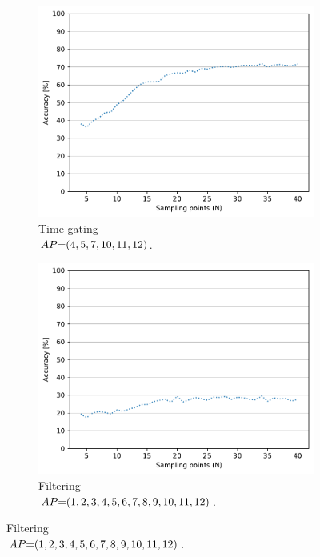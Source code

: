 \begin{figure}[ht]
    \begin{subfigure}{.49\textwidth}
        \centering
        \includegraphics[width=.99\linewidth]{Figures/RadarExperiments/Datasets/ThroughMaterials/Wood+PVC/samples-timegating-ud.pdf}
        \vspace{-5pt}
        \captionsetup{width=.99\linewidth}
        \caption{Time gating \\ $\splitatcommas{AP{=}(4, 5, 7, 10, 11, 12)}$.}
        \label{fig:radar-experiments:through-materials:wood-pvc-samples:timegating-ud}
    \end{subfigure}
    \begin{subfigure}{.49\textwidth}
        \centering
        \includegraphics[width=.99\linewidth]{Figures/RadarExperiments/Datasets/ThroughMaterials/Wood+PVC/samples-filtering-ud.pdf}  
        \vspace{-5pt}
        \captionsetup{width=.99\linewidth}
        \caption{Filtering \\ $\splitatcommas{AP{=}(1, 2, 3, 4, 5, 6, 7, 8, 9, 10, 11, 12)}$.}
        \label{fig:radar-experiments:through-materials:wood-pvc-samples:filtering-ud}
    \end{subfigure}
  

\end{figure}
